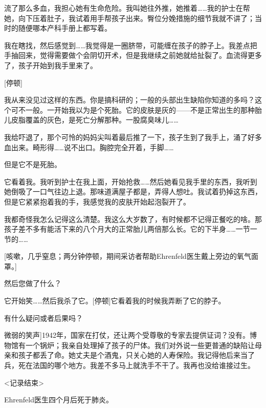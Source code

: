 流了那么多血，我担心她有生命危险。我叫她往外推，她推着……我的护士在帮她，向下压着肚子，我试着用手帮孩子出来。臀位分娩措施的细节我就不讲了；当时的随便哪本产科手册上都写着。

我在瞎找，然后感觉到……我觉得是一圈脐带，可能缠在孩子的脖子上。我差点把手抽回来，觉得需要做个会阴切开术，但是我继续之前她就给扯裂了。血流得更多了，孩子开始到我手里来了。

{[}停顿]

我从来没见过这样的东西。你是搞科研的；一般的头部出生缺陷你知道的多吗？这个可不一般。一开始我以为是个死胎。它的皮肤是灰的——不是正常出生的那种胎儿皮脂覆盖的灰色，是死亡分解那种。一股腐臭味儿……

我给吓退了，那个可怜的妈妈尖叫着最后推了一下，孩子生到了我手上，涌了好多血出来。畸形得……说不出口。胸腔完全开着，手脚……

但是它不是死胎。

它看着我。我听到护士在我上面，开始抢救……然后她看见我手里的东西，我听到她倒吸了一口气往边上退。那味道满屋子都是，弄得人想吐。我试着扔掉这东西，但是它紧紧抱着我的手，我感觉我的皮肤开始起泡裂开了。

我都奇怪我怎么记得这么清楚。我这么大岁数了，有时候都不记得正餐吃的啥。那孩子差不多有能活下来的八个月大的正常胎儿两倍那么长。它的下半身……一节一节的……

{[}咳嗽，几乎窒息；两分钟停顿，期间采访者帮助Ehrenfeld医生戴上旁边的氧气面罩。]

然后您做了什么？

它开始笑……然后我杀了它。{[}停顿]它看着我的时候我弄断了它的脖子。

有什么疑问或者后果吗？

\bb{Ehrenfeld医生：}{[}微弱的笑声]1942年，国家在打仗，还让两个受尊敬的专家去提供证词？没有。博物馆有一个锅炉；我亲自处理掉了孩子的尸体。我们对外说一些更普通的缺陷让母亲和孩子都丢了命。她丈夫是个酒鬼，只关心她的人寿保险。我记得他后来当了兵，死在法国的哪个地方。我差不多马上就洗手不干了。我再也没给谁接过生。

<记录结束>

Ehrenfeld医生四个月后死于肺炎。
